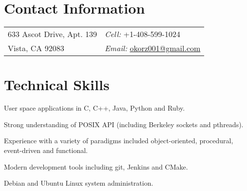 
\section{Contact Information}
%
%
%
\newlength{\rcollength}\setlength{\rcollength}{2.25in}%
%
\begin{tabular}[t]{@{}p{\textwidth-\rcollength}p{\rcollength}}
  633 Ascot Drive, Apt. 139 & \textit{Cell:} +1-408-599-1024\\
  Vista, CA 92083 & \textit{Email:}
  \href{mailto:okorz001@gmail.com}{okorz001@gmail.com}\\
\end{tabular}


\section{Technical Skills}
\begin{lonelist}
\item[]
\begin{innerlist}
\item User space applications in C, C++, Java, Python and Ruby.

\item Strong understanding of POSIX API (including Berkeley sockets and
    pthreads).

\item Experience with a variety of paradigms included object-oriented,
    procedural, event-driven and functional.

\item Modern development tools including git, Jenkins and CMake.

\item Debian and Ubuntu Linux system administration.
\end{innerlist}
\end{lonelist}


